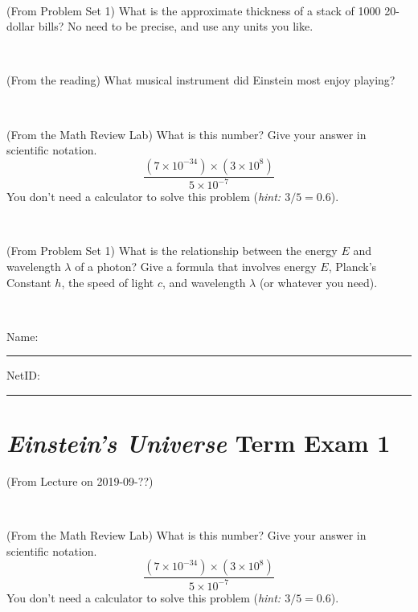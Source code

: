 \documentclass[12pt, letterpaper]{article}
\begin{document}
\vfill ~


\clearpage


\begin{problem} (From Problem Set 1)
What is the approximate thickness of a stack of 1000 20-dollar bills?
No need to be precise, and use any units you like.
\end{problem}


\vfill ~

\begin{problem} (From the reading)
What musical instrument did Einstein most enjoy playing?
\end{problem}


\vfill ~

\begin{problem} (From the Math Review Lab)
What is this number? Give your answer in scientific notation.
$$
\frac{(7\times10^{-34})\times(3\times10^8)}{5\times10^{-7}}
$$
You don't need a calculator to solve this problem (\textit{hint: $3/5=0.6$}).
\end{problem}


\vfill ~

\begin{problem} (From Problem Set 1)
What is the relationship between the energy $E$ and wavelength
$\lambda$ of a photon? Give a formula that involves energy $E$,
Planck's Constant $h$, the speed of light $c$, and wavelength
$\lambda$ (or whatever you need).
\end{problem}

\vfill ~


\cleardoublepage



\noindent
Name: \rule[-1ex]{0.60\textwidth}{0.1pt}
NetID: \rule[-1ex]{0.20\textwidth}{0.1pt}

\section*{\textsl{Einstein's Universe} Term Exam 1}
\setcounter{problem}{1}


\begin{problem} (From Lecture on 2019-09-??)
\end{problem}


\vfill ~

\begin{problem} (From the Math Review Lab)
What is this number? Give your answer in scientific notation.
$$
\frac{(7\times10^{-34})\times(3\times10^8)}{5\times10^{-7}}
$$
You don't need a calculator to solve this problem (\textit{hint: $3/5=0.6$}).
\end{problem}
\end{document}
